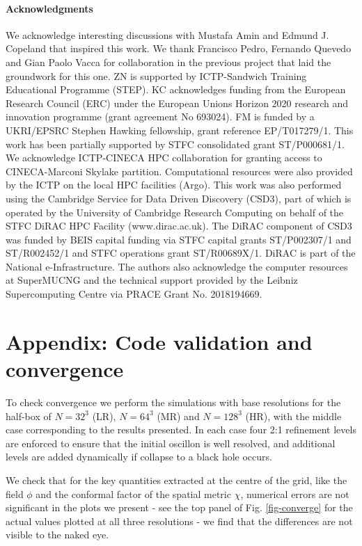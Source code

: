 \documentclass[11pt,a4paper]{article}
\begin{document}
\paragraph{Acknowledgments}
We acknowledge interesting discussions with Mustafa Amin and Edmund J. Copeland that inspired this work. We thank Francisco Pedro, Fernando Quevedo and Gian Paolo Vacca for collaboration in the previous project that laid the groundwork for this one.  ZN is supported by ICTP-Sandwich Training Educational Programme (STEP).  KC acknowledges funding from the European Research Council (ERC) under the European Unions Horizon 2020 research and innovation programme (grant agreement No 693024). FM is funded by a UKRI/EPSRC Stephen Hawking fellowship, grant reference EP/T017279/1. This work has been partially supported by STFC consolidated grant ST/P000681/1. We acknowledge ICTP-CINECA HPC collaboration for granting access to CINECA-Marconi Skylake partition. Computational resources were also provided by the ICTP on the local HPC facilities (Argo). This work was also performed using the Cambridge Service for Data Driven Discovery (CSD3), part of which is operated by the University of Cambridge Research Computing on behalf of the STFC DiRAC HPC Facility (www.dirac.ac.uk). The DiRAC component of CSD3 was funded by BEIS capital funding via STFC capital grants ST/P002307/1 and ST/R002452/1 and STFC operations grant ST/R00689X/1. DiRAC is part of the National e-Infrastructure. The authors also acknowledge the computer resources at SuperMUCNG and the technical support provided by the Leibniz Supercomputing Centre via PRACE Grant No. 2018194669.


\appendix

\section{Appendix: Code validation and convergence}
\label{sec-convergence}

To check convergence we perform the simulations with base resolutions for the half-box of $N=32^3$ (LR), $N=64^3$ (MR) and $N=128^3$ (HR), with the middle case corresponding to the results presented. In each case four 2:1 refinement levels are enforced to ensure that the initial oscillon is well resolved, and additional levels are added dynamically if collapse to a black hole occurs. 

We check that for the key quantities extracted at the centre of the grid, like the field $\phi$ and the conformal factor of the spatial metric $\chi$, numerical errors are not significant in the plots we present - see the top panel of Fig. \ref{fig-converge} for the actual values plotted at all three resolutions - we find that the differences are not visible to the naked eye. 
\end{document}
